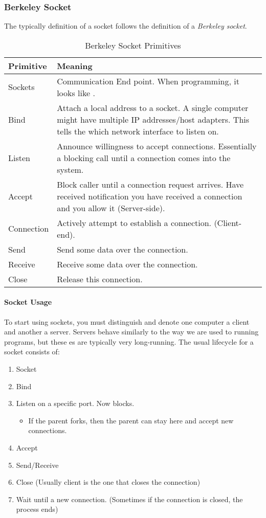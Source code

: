 \subsubsection{Berkeley Socket}\label{subsubsec:Berkeley_Socket}
The typically definition of a socket follows the definition of a \emph{Berkeley socket}.
\begin{table}[h!tbp]
  \centering
  \begin{tabular}{lp{16cm}}
    \toprule
    Primitive & Meaning\\
    \midrule
    Sockets & Communication End point. When programming, it looks like \nameref{def:File_Descriptor}. \\
    Bind & Attach a local address to a socket. A single computer might have multiple IP addresses/host adapters. This tells the \nameref{def:Process} which network interface to listen on. \\
    Listen & Announce willingness to accept connections. Essentially a blocking call until a connection comes into the system. \\
    Accept & Block caller until a connection request arrives. Have received notification you have received a connection and you allow it (Server-side). \\
    Connection & Actively attempt to establish a connection. (Client-end). \\
    Send & Send some data over the connection. \\
    Receive & Receive some data over the connection. \\
    Close & Release this connection. \\
    \bottomrule
  \end{tabular}
  \caption{Berkeley Socket Primitives}
  \label{tab:Berkley_Socket_Primitives}
\end{table}

\paragraph{Socket Usage}\label{par:Socket_Usage}
To start using sockets, you must distinguish and denote one computer a client and another a server.
Servers behave similarly to the way we are used to running programs, but these es are typically very long-running.
The usual lifecycle for a socket consists of:
\begin{enumerate}[noitemsep]
\item Socket
\item Bind
\item Listen on a specific port. Now blocks.
  \begin{itemize}[noitemsep]
  \item If the parent forks, then the parent can stay here and accept new connections.
  \end{itemize}
\item Accept
\item Send/Receive
\item Close (Usually client is the one that closes the connection)
\item Wait until a new connection. (Sometimes if the connection is closed, the process ends)
\end{enumerate}

